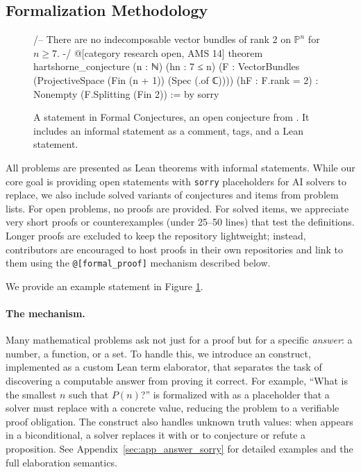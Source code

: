 \subsection{Formalization Methodology}\label{sec:formalization-methodology}

\begin{figure}[t!]
    \centering
    \begin{leancode}
/--
There are no indecomposable vector bundles of rank 2 on $\mathbb{P}^n$ for $n \ge 7$.
-/
@[category research open, AMS 14]
theorem hartshorne_conjecture (n : ℕ) (hn : 7 ≤ n)
    (F : VectorBundles (ProjectiveSpace (Fin (n + 1)) (Spec (.of ℂ))))
    (hF : F.rank = 2) : Nonempty (F.Splitting (Fin 2)) := by
  sorry
    \end{leancode}
    \caption{A statement in Formal Conjectures, an open conjecture from \citep{hartshorne1974varieties}. It includes an informal statement as a comment, tags, and a Lean statement.}
    \label{fig:example-statement}
\end{figure}

All problems are presented as Lean theorems with informal statements. While our core goal is providing open statements with \lstinline{sorry} placeholders for AI solvers to replace, we also include solved variants of conjectures and items from problem lists. For open problems, no proofs are provided. For solved items, we appreciate very short proofs or counterexamples (under 25--50 lines) that test the definitions. Longer proofs are excluded to keep the repository lightweight; instead, contributors are encouraged to host proofs in their own repositories and link to them using the \lstinline{@[formal_proof]} mechanism described below.

We provide an example statement in Figure \ref{fig:example-statement}.






\paragraph{The \texorpdfstring{}{answer(sorry)} mechanism.}
Many mathematical problems ask not just for a proof but for a specific \emph{answer}: a number, a function, or a set.
To handle this, we introduce an  construct, implemented as a custom Lean term elaborator, that separates the task of discovering a computable answer from proving it correct.
For example, \enquote{What is the smallest $n$ such that $P(n)$?} is formalized with  as a placeholder that a solver must replace with a concrete value, reducing the problem to a verifiable proof obligation.
The construct also handles unknown truth values: when  appears in a biconditional, a solver replaces it with  or  to conjecture or refute a proposition.
See Appendix~\ref{sec:app_answer_sorry} for detailed examples and the full elaboration semantics.



